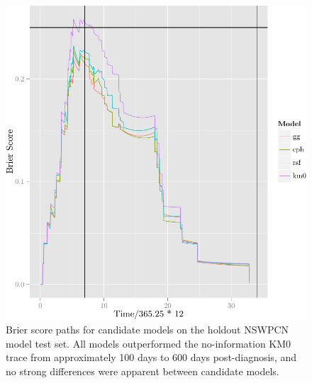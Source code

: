 \documentclass[dissertation.tex]{subfiles}
\begin{document}
\begin{figure}
\centering
  \includegraphics[width=.7\linewidth]{analysis/nomogram/figure/05-model-selection-bs-paths-1}
  \caption[Brier score paths for candidate models on holdout data]{Brier score paths for candidate models on the holdout \gls{NSWPCN} model test set.  All models outperformed the no-information KM0 trace from approximately 100 days to 600 days post-diagnosis, and no strong differences were apparent between candidate models.}
\label{fig:nomo-brier-paths}
\end{figure}
\end{document}
